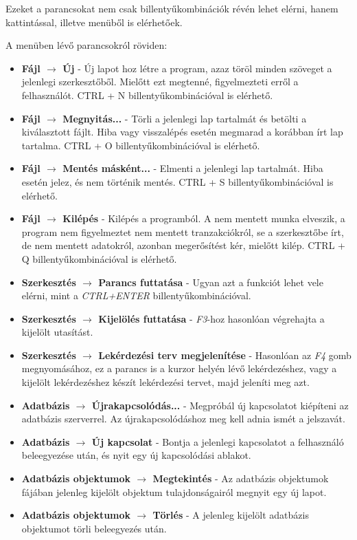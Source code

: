Ezeket a parancsokat nem csak billentyűkombinációk révén lehet elérni, hanem kattintással, illetve menüből is elérhetőek.

A menüben lévő parancsokról röviden:
\begin{itemize}
  \item \textbf{Fájl $\rightarrow$ Új} - Új lapot hoz létre a program, azaz töröl minden szöveget a jelenlegi szerkesztőből. Mielőtt ezt megtenné, figyelmezteti erről a felhasználót. CTRL + N billentyűkombinációval is elérhető.
  \item \textbf{Fájl $\rightarrow$ Megnyitás...} - Törli a jelenlegi lap tartalmát és betölti a kiválasztott fájlt. Hiba vagy visszalépés esetén
  megmarad a korábban írt lap tartalma. CTRL + O billentyűkombinációval is elérhető.
  \item \textbf{Fájl $\rightarrow$ Mentés másként...} - Elmenti a jelenlegi lap tartalmát. Hiba esetén jelez, és nem történik mentés.
  CTRL + S billentyűkombinációval is elérhető.
  \item \textbf{Fájl $\rightarrow$ Kilépés} - Kilépés a programból. A nem mentett munka elveszik, a program nem figyelmeztet nem mentett tranzakciókról,
  se a szerkesztőbe írt, de nem mentett adatokról, azonban megerősítést kér, mielőtt kilép. CTRL + Q billentyűkombinációval is elérhető.
  \item \textbf{Szerkesztés $\rightarrow$ Parancs futtatása} - Ugyan azt a funkciót lehet vele elérni, mint a \textit{CTRL+ENTER} billentyűkombinációval.
  \item \textbf{Szerkesztés $\rightarrow$ Kijelölés futtatása} - \textit{F3}-hoz hasonlóan végrehajta a kijelölt utasítást.
  \item \textbf{Szerkesztés $\rightarrow$ Lekérdezési terv megjelenítése} - Hasonlóan az \textit{F4} gomb megnyomásához, ez a parancs is a kurzor helyén lévő lekérdezéshez,
  vagy a kijelölt lekérdezéshez készít lekérdezési tervet, majd jeleníti meg azt.
  \item \textbf{Adatbázis $\rightarrow$ Újrakapcsolódás...} - Megpróbál új kapcsolatot kiépíteni az adatbázis szerverrel. Az újrakapcsolódáshoz meg kell adnia ismét
  a jelszavát.
  \item \textbf{Adatbázis $\rightarrow$ Új kapcsolat} - Bontja a jelenlegi kapcsolatot a felhasználó beleegyezése után, és nyit egy új kapcsolódási ablakot.
  \item \textbf{Adatbázis objektumok $\rightarrow$ Megtekintés} - Az adatbázis objektumok fájában jelenleg kijelölt objektum tulajdonságairól megnyit egy új lapot.
  \item \textbf{Adatbázis objektumok $\rightarrow$ Törlés} - A jelenleg kijelölt adatbázis objektumot törli beleegyezés után.
\end{itemize}


